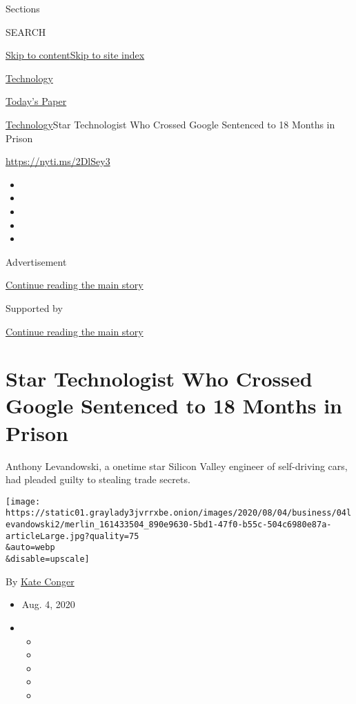 Sections

SEARCH

\protect\hyperlink{site-content}{Skip to
content}\protect\hyperlink{site-index}{Skip to site index}

\href{https://www.nytimes3xbfgragh.onion/section/technology}{Technology}

\href{https://myaccount.nytimes3xbfgragh.onion/auth/login?response_type=cookie\&client_id=vi}{}

\href{https://www.nytimes3xbfgragh.onion/section/todayspaper}{Today's
Paper}

\href{/section/technology}{Technology}\textbar{}Star Technologist Who
Crossed Google Sentenced to 18 Months in Prison

\url{https://nyti.ms/2DlSey3}

\begin{itemize}
\item
\item
\item
\item
\item
\end{itemize}

Advertisement

\protect\hyperlink{after-top}{Continue reading the main story}

Supported by

\protect\hyperlink{after-sponsor}{Continue reading the main story}

\hypertarget{star-technologist-who-crossed-google-sentenced-to-18-months-in-prison}{%
\section{Star Technologist Who Crossed Google Sentenced to 18 Months in
Prison}\label{star-technologist-who-crossed-google-sentenced-to-18-months-in-prison}}

Anthony Levandowski, a onetime star Silicon Valley engineer of
self-driving cars, had pleaded guilty to stealing trade secrets.

\texttt{[image: https://static01.graylady3jvrrxbe.onion/images/2020/08/04/business/04levandowski2/merlin\_161433504\_890e9630-5bd1-47f0-b55c-504c6980e87a-articleLarge.jpg?quality=75\\\&auto=webp\\\&disable=upscale]}

By \href{https://www.nytimes3xbfgragh.onion/by/kate-conger}{Kate Conger}

\begin{itemize}
\item
  Aug. 4, 2020
\item
  \begin{itemize}
  \item
  \item
  \item
  \item
  \item
  \end{itemize}
\end{itemize}


